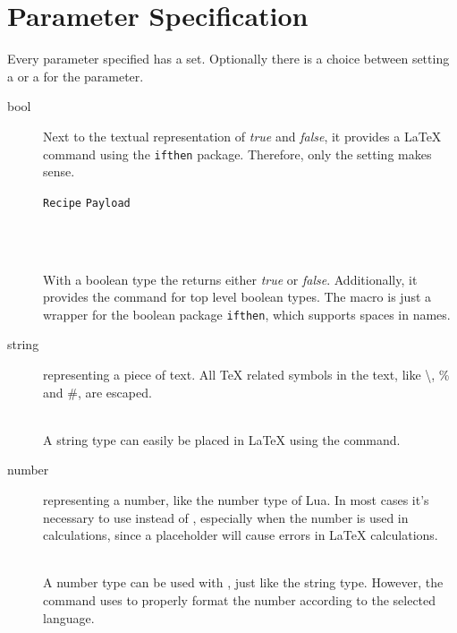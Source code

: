 \documentclass{ltxdoc}
\newcommand\showexample[5][15pt]{%
\begin{minipage}[t]{.5\linewidth - .5 \columnsep}%

\end{minipage}\hspace*{\columnsep}%
\begin{minipage}[t]{.5\linewidth - .5 \columnsep}%

\end{minipage}\\%
}
\begin{document}
    \section{Parameter Specification}\label{sec:spec}
    Every parameter specified has a  set.
    Optionally there is a choice between setting a  or a  for the parameter.
    \begin{description}
        \item[bool] Next to the textual representation of \textit{true} and \textit{false}, it provides a \LaTeX{} command using the \texttt{ifthen} package.
        Therefore, only the  setting makes sense.\\[5pt]
        \hspace*{5pt}\parbox{\linewidth-5pt}{%
            \hfill\texttt{Recipe}\hfill\hspace*{\columnsep}%
            \hfill\texttt{Payload}\hfill\hspace*{\columnsep}}\\%
        \showexample{1}{1-3}{1}{1-1}
        \DescribeMacro{\param}
        With a boolean type the \cmd{\param} returns either \textit{true} or \textit{false}.
        \DescribeMacro{\ifparam}
        Additionally, it provides the \cmd{\ifparam} command for top level boolean types.
        The macro is just a wrapper for the boolean package \texttt{ifthen}, which supports spaces in names.
        \item[string] representing a piece of text.
        All \TeX{} related symbols in the text, like \textbackslash, \% and \#, are escaped.\\
        \showexample{4}{4-6}{2}{2-2}
        \DescribeMacro{\param} A string type can easily be placed in \LaTeX{} using the \cmd{\param} command.
        \item[number] representing a number, like the number type of Lua.
        In most cases it's necessary to use  instead of , especially when the number is used in calculations, since a placeholder will cause errors in \LaTeX{} calculations.\\
        \showexample{7}{7-9}{3}{3-3}
        A number type can be used with \cmd{\param}, just like the string type.
        \DescribeMacro{\numparam} However, the \cmd{\numparam} command uses \cmd{\numprint} to properly format the number according to the selected language.

\end{description}
\end{document}
